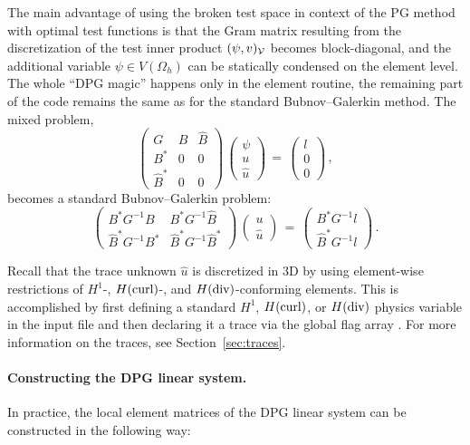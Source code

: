 The main advantage of using the broken test space in context of the PG method with optimal test functions is that the Gram matrix resulting from the discretization of
the test inner product $(\psi,v)_{\mathcal{V}}$ becomes block-diagonal, and the additional variable $\psi \in V(\Omega_h)$ can be statically condensed on the
element level. The whole ``DPG magic'' happens only in the element routine, the remaining part of the code remains the same as for the standard Bubnov--Galerkin method. The mixed problem,
\[
\left(
\begin{array}{ccc}
G & B & \hat{B} \\
B^* & 0& 0\\
\hat{B}^* & 0& 0
\end{array}
\right)
\, 
\left(
\begin{array}{c}
\psi\\u\\\hat{u}
\end{array}
\right)
\, = \,
\left(
\begin{array}{c}
l \\0 \\0
\end{array}
\right)\, ,
\]
becomes a standard Bubnov--Galerkin problem:
\[
\left(
\begin{array}{cc}
B^* G^{-1} B & B^* G^{-1} \hat{B} \\
\hat{B}^* G^{-1} B^* & \hat{B}^* G^{-1} \hat{B}^*
\end{array}
\right)
\, 
\left(
\begin{array}{c}
u\\\hat{u}
\end{array}
\right)
\, = \,
\left(
\begin{array}{c}
B^* G^{-1}  l \\\hat{B}^* G^{-1} l
\end{array}
\right)\, .
\]

Recall that the trace unknown $\hat u$ is discretized in \hp3D by using element-wise restrictions of $H^1$-, $H(\text{curl})$-, and $H(\text{div})$-conforming elements. This is accomplished by first defining a standard $H^1$, $H(\text{curl})$, or $H(\text{div})$ physics variable in the  input file and then declaring it a trace via the global flag array . For more information on the traces, see Section~\ref{sec:traces}.

\paragraph{Constructing the DPG linear system.}
In practice, the local element matrices of the DPG linear system can be constructed in the following way:

